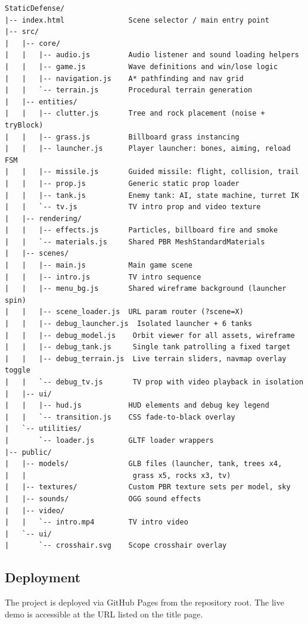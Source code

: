 \documentclass[11pt, a4paper]{article}
\begin{document}
\begin{lstlisting}[language={}, caption={Project file tree}, label={lst:tree}]
StaticDefense/
|-- index.html               Scene selector / main entry point
|-- src/
|   |-- core/
|   |   |-- audio.js         Audio listener and sound loading helpers
|   |   |-- game.js          Wave definitions and win/lose logic
|   |   |-- navigation.js    A* pathfinding and nav grid
|   |   `-- terrain.js       Procedural terrain generation
|   |-- entities/
|   |   |-- clutter.js       Tree and rock placement (noise + tryBlock)
|   |   |-- grass.js         Billboard grass instancing
|   |   |-- launcher.js      Player launcher: bones, aiming, reload FSM
|   |   |-- missile.js       Guided missile: flight, collision, trail
|   |   |-- prop.js          Generic static prop loader
|   |   |-- tank.js          Enemy tank: AI, state machine, turret IK
|   |   `-- tv.js            TV intro prop and video texture
|   |-- rendering/
|   |   |-- effects.js       Particles, billboard fire and smoke
|   |   `-- materials.js     Shared PBR MeshStandardMaterials
|   |-- scenes/
|   |   |-- main.js          Main game scene
|   |   |-- intro.js         TV intro sequence
|   |   |-- menu_bg.js       Shared wireframe background (launcher spin)
|   |   |-- scene_loader.js  URL param router (?scene=X)
|   |   |-- debug_launcher.js  Isolated launcher + 6 tanks
|   |   |-- debug_model.js    Orbit viewer for all assets, wireframe 
|   |   |-- debug_tank.js     Single tank patrolling a fixed target
|   |   |-- debug_terrain.js  Live terrain sliders, navmap overlay toggle
|   |   `-- debug_tv.js       TV prop with video playback in isolation
|   |-- ui/
|   |   |-- hud.js           HUD elements and debug key legend
|   |   `-- transition.js    CSS fade-to-black overlay
|   `-- utilities/
|       `-- loader.js        GLTF loader wrappers
|-- public/
|   |-- models/              GLB files (launcher, tank, trees x4,
|   |                         grass x5, rocks x3, tv)
|   |-- textures/            Custom PBR texture sets per model, sky
|   |-- sounds/              OGG sound effects
|   |-- video/
|   |   `-- intro.mp4        TV intro video
|   `-- ui/
|       `-- crosshair.svg    Scope crosshair overlay
\end{lstlisting}

	\subsection{Deployment}

	The project is deployed via GitHub Pages from the repository root. The live demo is
	accessible at the URL listed on the title page.
\end{document}
